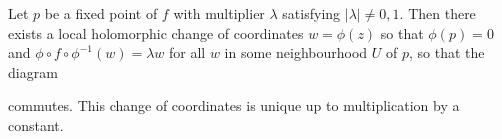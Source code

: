 \documentclass[10pt,a4paper]{article}
\begin{document}
\begin{theorem}
  Let $p$ be a fixed point of $f$ with multiplier $\lambda$ satisfying $|\lambda|\neq 0, 1$. Then there exists a local holomorphic change of coordinates $w = \phi(z)$ so that $\phi(p) = 0$ and $\phi\circ f\circ \phi^{-1}(w) = \lambda w$ for all $w$ in some neighbourhood $U$ of $p$, so that the diagram
  \begin{center}
  \end{center}
  commutes. This change of coordinates is unique up to multiplication by a constant.
\end{theorem}
\end{document}

